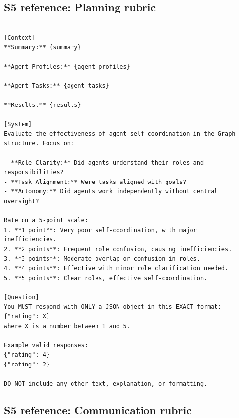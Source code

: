\documentclass[10pt,letterpaper,twocolumn]{article}
\begin{document}
\subsection*{S5 reference: Planning rubric}

\begin{Verbatim}[fontsize=\small,breaklines=true,breakanywhere=true]

[Context]
**Summary:** {summary}

**Agent Profiles:** {agent_profiles}

**Agent Tasks:** {agent_tasks}

**Results:** {results}

[System]
Evaluate the effectiveness of agent self-coordination in the Graph structure. Focus on:

- **Role Clarity:** Did agents understand their roles and responsibilities?
- **Task Alignment:** Were tasks aligned with goals?
- **Autonomy:** Did agents work independently without central oversight?

Rate on a 5-point scale:
1. **1 point**: Very poor self-coordination, with major inefficiencies.
2. **2 points**: Frequent role confusion, causing inefficiencies.
3. **3 points**: Moderate overlap or confusion in roles.
4. **4 points**: Effective with minor role clarification needed.
5. **5 points**: Clear roles, effective self-coordination.

[Question]
You MUST respond with ONLY a JSON object in this EXACT format:
{"rating": X}
where X is a number between 1 and 5.

Example valid responses:
{"rating": 4}
{"rating": 2}

DO NOT include any other text, explanation, or formatting.
\end{Verbatim}

\subsection*{S5 reference: Communication rubric}
\end{document}
